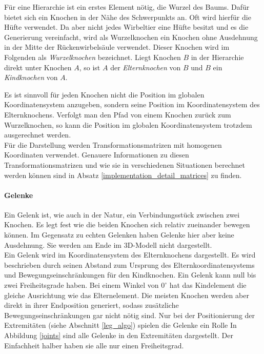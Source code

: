 Für eine Hierarchie ist ein erstes Element nötig, die Wurzel des Baums.
Dafür bietet sich ein Knochen in der Nähe des Schwerpunkts an. Oft wird hierfür die Hüfte verwendet. 
Da aber nicht jedes Wirbeltier eine Hüfte besitzt und es die Generierung vereinfacht, wird als Wurzelknochen ein Knochen ohne Ausdehnung in der Mitte der Rückenwirbelsäule verwendet. Dieser Knochen wird im Folgenden als \emph{Wurzelknochen} bezeichnet. Liegt Knochen $B$ in der Hierarchie direkt unter Knochen $A$, so ist $A$ der \emph{Elternknochen} von $B$ und $B$ ein \emph{Kindknochen} von $A$.

Es ist sinnvoll für jeden Knochen nicht die Position im globalen Koordinatensystem anzugeben, sondern seine Position im Koordinatensystem des Elternknochens. Verfolgt man den Pfad von einem Knochen zurück zum Wurzelknochen, so kann die Position im globalen Koordinatensystem trotzdem ausgerechnet werden.  \\
Für die Darstellung werden Transformationsmatrizen mit homogenen Koordinaten verwendet. Genauere Informationen zu diesen Transformationsmatrizen und wie sie in verschiedenen Situationen berechnet werden können sind in Absatz \ref{implementation_detail_matrices} zu finden.

\paragraph{Gelenke}
Ein Gelenk ist, wie auch in der Natur, ein Verbindungsstück zwischen zwei Knochen. Es legt fest wie die beiden Knochen sich relativ zueinander bewegen können. Im Gegensatz zu echten Gelenken haben Gelenke hier aber keine Ausdehnung. Sie werden am Ende im 3D-Modell nicht dargestellt.\\
Ein Gelenk wird im Koordinatensystem des Elternknochens dargestellt. Es wird beschrieben durch seinen Abstand zum Ursprung des Elternkoordinatensystems und Bewegungseinschränkungen für den Kindknochen. Ein Gelenk kann null bis zwei Freiheitsgrade haben. Bei einem Winkel von $0^\circ$ hat das Kindelement die gleiche Ausrichtung wie das Elternelement. 
Die meisten Knochen werden aber direkt in ihrer Endposition generiert, sodass zusätzliche Bewegungseinschränkungen gar nicht nötig sind. Nur bei der Positionierung der Extremitäten (siehe Abschnitt \ref{leg_algo}) spielen die Gelenke ein Rolle
In Abbildung \ref{joints} sind alle Gelenke in den Extremitäten dargestellt. Der Einfachheit halber haben sie alle nur einen Freiheitsgrad.

